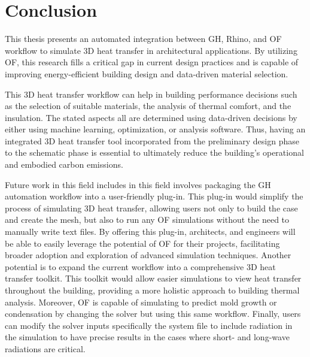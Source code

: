 \chapter{Conclusion}
This thesis presents an automated integration between  \gls{GH}, Rhino, and \gls{OF} workflow to simulate 3D heat transfer in architectural applications. 
By utilizing \gls{OF}, this research fills a critical gap in current design practices and is capable of improving energy-efficient building design and data-driven material selection. 

This 3D heat transfer workflow can help in building performance decisions such as the selection of suitable materials, the analysis of thermal comfort, and the insulation.
The stated aspects all are determined using data-driven decisions by either using machine learning, optimization, or analysis software. Thus, having an integrated 3D heat transfer tool incorporated from the preliminary design phase to the schematic phase is essential to ultimately reduce the building's operational and embodied carbon emissions. 

Future work in this field includes in this field involves packaging the \gls{GH} automation workflow into a user-friendly plug-in. This plug-in would simplify the process of simulating 3D heat transfer, allowing users not only to build the case and create the mesh, but also to run any \gls{OF} simulations without the need to manually write text files. By offering this plug-in, architects, and engineers will be able to easily leverage the potential of \gls{OF} for their projects, facilitating broader adoption and exploration of advanced simulation techniques. Another potential is to expand the current workflow into a comprehensive 3D heat transfer toolkit. This toolkit would allow easier simulations to view heat transfer throughout the building, providing a more holistic approach to building thermal analysis. Moreover, \gls{OF} is capable of simulating to predict mold growth or condensation by changing the solver but using this same workflow. Finally, users can modify the solver inputs specifically the system file to include radiation in the simulation to have precise results in the cases where short- and long-wave radiations are critical. 








